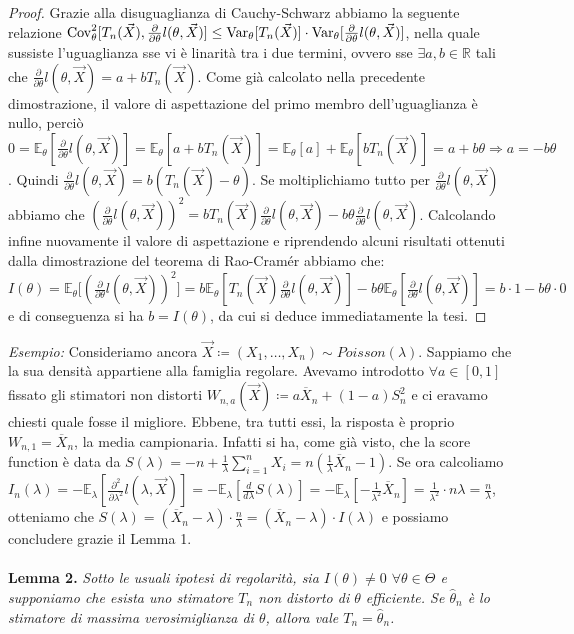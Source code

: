 \begin{proof}
Grazie alla disuguaglianza di Cauchy-Schwarz abbiamo la seguente relazione $\operatorname{Cov}_\theta^2[T_n(\vec{X}), \frac{\partial}{\partial\theta}l(\theta,\vec{X})]\leq \operatorname{Var}_\theta[T_n(\vec{X})]\cdot\operatorname{Var}_\theta[\frac{\partial}{\partial\theta}l(\theta,\vec{X})]$, nella  quale sussiste l'uguaglianza sse vi è linarità tra i due termini, ovvero sse $\exists a,b\in \mathbb{R}$ tali che $\frac{\partial}{\partial\theta}l(\theta,\vec{X})=a+bT_n(\vec{X})$. Come già calcolato nella precedente dimostrazione, il valore di aspettazione del primo membro dell'uguaglianza è nullo, perciò $0=\mathbb{E}_\theta[\frac{\partial}{\partial\theta}l(\theta,\vec{X})]= \mathbb{E}_\theta[a+bT_n(\vec{X})]=\mathbb{E}_\theta[a]+\mathbb{E}_\theta[bT_n(\vec{X})]=a+b\theta \Rightarrow a=-b\theta$. Quindi $\frac{\partial}{\partial\theta}l(\theta,\vec{X})=b(T_n(\vec{X})-\theta)$. Se moltiplichiamo tutto per $\frac{\partial}{\partial\theta}l(\theta,\vec{X})$ abbiamo che $\left(\frac{\partial}{\partial\theta}l(\theta,\vec{X})\right)^2=bT_n(\vec{X})\frac{\partial}{\partial\theta}l(\theta,\vec{X})-b\theta \frac{\partial}{\partial\theta}l(\theta,\vec{X})$. Calcolando infine nuovamente il valore di aspettazione e riprendendo alcuni risultati ottenuti dalla dimostrazione del teorema di Rao-Cramér abbiamo che: \\
$I(\theta)=\mathbb{E}_\theta\Big[\left(\frac{\partial}{\partial\theta}l(\theta,\vec{X})\right)^2\Big]=b\mathbb{E}_\theta[T_n(\vec{X})\frac{\partial}{\partial\theta}l(\theta,\vec{X})]-b\theta\mathbb{E}_\theta [\frac{\partial}{\partial\theta}l(\theta,\vec{X})]=b\cdot 1-b\theta\cdot 0$ e di conseguenza si ha $b=I(\theta)$, da cui si deduce immediatamente la tesi.

\end{proof}
\textit{Esempio:} Consideriamo ancora $\vec{X}\coloneqq (X_1,\ldots,X_n)\sim Poisson(\lambda)$. Sappiamo che la sua densità appartiene alla famiglia regolare. Avevamo introdotto $\forall a\in [0,1]$ fissato gli stimatori non distorti $W_{n,a}(\vec{X})\coloneqq a\overline{X}_n +(1-a)S_n^2$ e ci eravamo chiesti quale fosse il migliore. Ebbene, tra tutti essi, la risposta è proprio $W_{n,1}=\overline{X}_n$, la media campionaria. Infatti si ha, come già visto, che la score function è data da $S(\lambda)=-n+\frac{1}{\lambda}\sum_{i=1}^n X_i=n\left(\frac{1}{\lambda}\overline{X}_n-1\right)$. Se ora calcoliamo $I_n(\lambda)=-\mathbb{E}_{\lambda}[\frac{\partial^2}{\partial\lambda^2}l(\lambda,\vec{X})]= -\mathbb{E}_{\lambda}[\frac{d}{d\lambda} S(\lambda)]= -\mathbb{E}_{\lambda}[-\frac{1}{\lambda^2}\overline{X}_n]=\frac{1}{\lambda^2}\cdot n\lambda=\frac{n}{\lambda}$, otteniamo che $S(\lambda)= (\overline{X}_n-\lambda)\cdot \frac{n}{\lambda}=(\overline{X}_n-\lambda)\cdot I(\lambda)$ e possiamo concludere grazie il Lemma 1.
\\
\\
\textbf{Lemma 2.} \textit{Sotto le usuali ipotesi di regolarità, sia $I(\theta)\neq 0$ $\forall \theta\in \Theta$ e supponiamo che esista uno stimatore $T_n$ non distorto di $\theta$ efficiente. Se $\hat{\theta}_n$ è lo stimatore di massima verosimiglianza di $\theta$, allora vale $T_n=\hat{\theta}_n$.}

